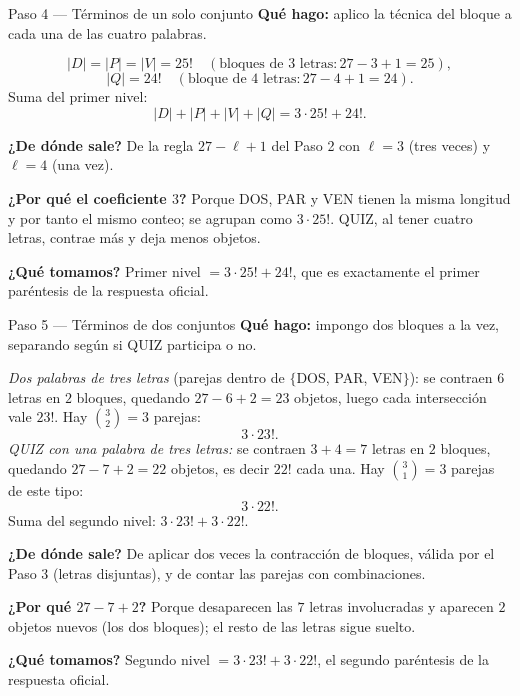 \documentclass[11pt]{article}
\begin{document}
\begin{paso}{Paso 4 --- Términos de un solo conjunto}
\textbf{Qué hago:} aplico la técnica del bloque a cada una de las cuatro palabras.

\[
|D| = |P| = |V| = 25! \quad (\text{bloques de }3\text{ letras}: 27-3+1 = 25),
\]
\[
|Q| = 24! \quad (\text{bloque de }4\text{ letras}: 27-4+1 = 24).
\]
Suma del primer nivel:
\[
|D|+|P|+|V|+|Q| = 3\cdot 25! + 24! .
\]

\textbf{¿De dónde sale?} De la regla $27-\ell+1$ del Paso 2 con $\ell=3$ (tres veces) y $\ell=4$ (una vez).

\textbf{¿Por qué el coeficiente $3$?} Porque DOS, PAR y VEN tienen la misma longitud y por tanto el mismo conteo; se agrupan como $3\cdot 25!$. QUIZ, al tener cuatro letras, contrae más y deja menos objetos.

\textbf{¿Qué tomamos?} Primer nivel $= 3\cdot 25! + 24!$, que es exactamente el primer paréntesis de la respuesta oficial.
\end{paso}

\begin{paso}{Paso 5 --- Términos de dos conjuntos}
\textbf{Qué hago:} impongo dos bloques a la vez, separando según si QUIZ participa o no.

\emph{Dos palabras de tres letras} (parejas dentro de $\{$DOS, PAR, VEN$\}$): se contraen $6$ letras en $2$ bloques, quedando $27-6+2 = 23$ objetos, luego cada intersección vale $23!$. Hay $\binom{3}{2}=3$ parejas:
\[
3\cdot 23! .
\]
\emph{QUIZ con una palabra de tres letras:} se contraen $3+4 = 7$ letras en $2$ bloques, quedando $27-7+2 = 22$ objetos, es decir $22!$ cada una. Hay $\binom{3}{1}=3$ parejas de este tipo:
\[
3\cdot 22! .
\]
Suma del segundo nivel: $3\cdot 23! + 3\cdot 22!$.

\textbf{¿De dónde sale?} De aplicar dos veces la contracción de bloques, válida por el Paso 3 (letras disjuntas), y de contar las parejas con combinaciones.

\textbf{¿Por qué $27-7+2$?} Porque desaparecen las $7$ letras involucradas y aparecen $2$ objetos nuevos (los dos bloques); el resto de las letras sigue suelto.

\textbf{¿Qué tomamos?} Segundo nivel $= 3\cdot 23! + 3\cdot 22!$, el segundo paréntesis de la respuesta oficial.
\end{paso}
\end{document}
